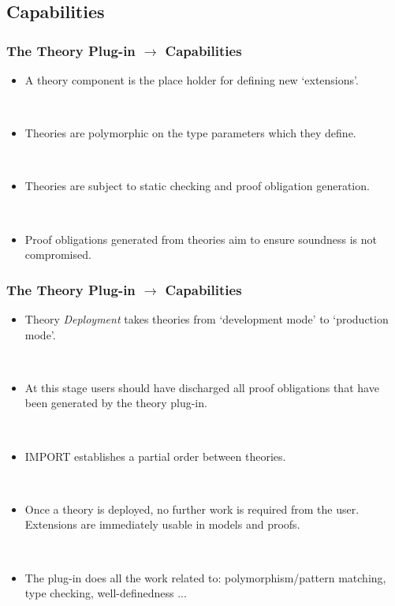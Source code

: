 \documentclass{beamer}
\begin{document}
	\subsection{Capabilities}
	\begin{frame}
		\frametitle{The Theory Plug-in $\rightarrow$ Capabilities}
		\begin{itemize}
			\item A theory component is the place holder for defining new `extensions'.

~

			\item Theories are polymorphic on the type parameters which they define.

~
			\item Theories are subject to static checking and proof obligation generation.

~
			\item Proof obligations generated from theories aim to ensure soundness is not compromised.
		\end{itemize}
	\end{frame}
	\begin{frame}
		\frametitle{The Theory Plug-in $\rightarrow$ Capabilities}
		\begin{itemize}
			\item Theory \emph{Deployment} takes theories from `development mode' to `production mode'.

~

			\item At this stage users should have discharged all proof obligations that have been generated by the theory plug-in.

~
			\item IMPORT establishes a partial order between theories.

~
			\item Once a theory is deployed, no further work is required from the user. Extensions are immediately usable in models and proofs.

~

			\item The plug-in does all the work related to: polymorphism/pattern matching, type checking, well-definedness ...
		\end{itemize}
	\end{frame}
\end{document}
